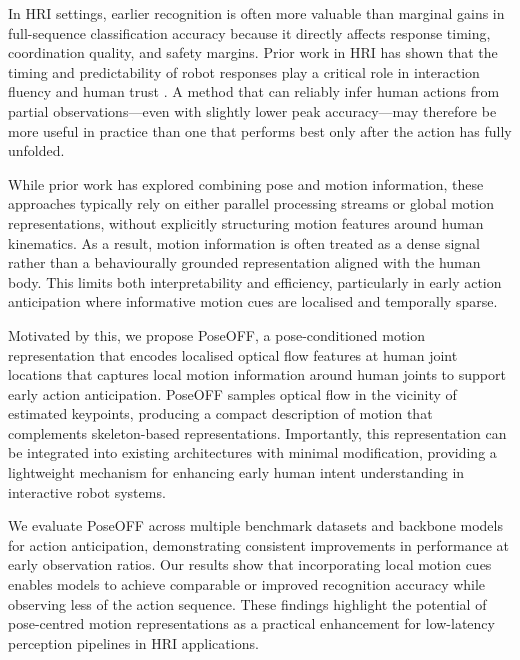 \documentclass[letterpaper, 10 pt, conference]{ieeeconf}
\begin{document}
In HRI settings, earlier recognition is often more valuable than marginal gains in full-sequence classification accuracy because it directly affects response timing, coordination quality, and safety margins. Prior work in HRI has shown that the timing and predictability of robot responses play a critical role in interaction fluency and human trust \cite{dragan2013Legibilitypredictabilityrobotmotion}. A method that can reliably infer human actions from partial observations—even with slightly lower peak accuracy—may therefore be more useful in practice than one that performs best only after the action has fully unfolded.

While prior work has explored combining pose and motion information, these approaches typically rely on either parallel processing streams or global motion representations, without explicitly structuring motion features around human kinematics. As a result, motion information is often treated as a dense signal rather than a behaviourally grounded representation aligned with the human body. This limits both interpretability and efficiency, particularly in early action anticipation where informative motion cues are localised and temporally sparse.

Motivated by this, we propose PoseOFF, a pose-conditioned motion representation that encodes localised optical flow features at human joint locations that captures local motion information around human joints to support early action anticipation. PoseOFF samples optical flow in the vicinity of estimated keypoints, producing a compact description of motion that complements skeleton-based representations. Importantly, this representation can be integrated into existing architectures with minimal modification, providing a lightweight mechanism for enhancing early human intent understanding in interactive robot systems.



We evaluate PoseOFF across multiple benchmark datasets and backbone models for action anticipation, demonstrating consistent improvements in performance at early observation ratios. Our results show that incorporating local motion cues enables models to achieve comparable or improved recognition accuracy while observing less of the action sequence. These findings highlight the potential of pose-centred motion representations as a practical enhancement for low-latency perception pipelines in HRI applications.
\end{document}
